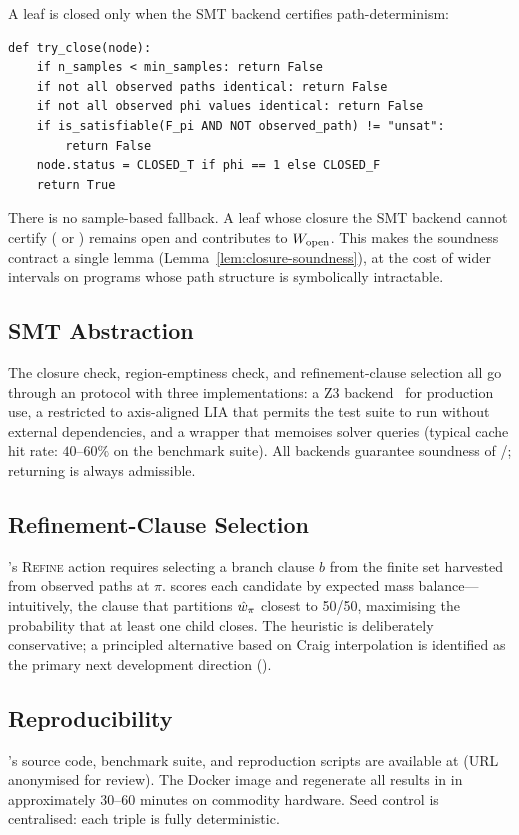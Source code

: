 A leaf is closed only when the SMT backend certifies
path-determinism:
\begin{verbatim}
def try_close(node):
    if n_samples < min_samples: return False
    if not all observed paths identical: return False
    if not all observed phi values identical: return False
    if is_satisfiable(F_pi AND NOT observed_path) != "unsat":
        return False
    node.status = CLOSED_T if phi == 1 else CLOSED_F
    return True
\end{verbatim}
There is no sample-based fallback.  A leaf whose closure the SMT
backend cannot certify (\sat{} or \unknown{}) remains open and
contributes to $W_{\mathrm{open}}$.  This makes the soundness contract a single
lemma (Lemma~\ref{lem:closure-soundness}), at the cost of wider
intervals on programs whose path structure is symbolically
intractable.

\subsection{SMT Abstraction}\label{sec:smt}

The closure check, region-emptiness check, and refinement-clause
selection all go through an  protocol with three
implementations: a Z3 backend~\cite{demoura2008z3} for production use,
a  restricted to axis-aligned LIA that permits the
test suite to run without external dependencies, and a
 wrapper that memoises solver queries (typical
cache hit rate: $40$--$60\%$ on the benchmark suite).  All backends
guarantee soundness of \sat/\unsat{}; returning \unknown{} is always
admissible.

\subsection{Refinement-Clause Selection}\label{sec:clause-selection}

\toolname{}'s \textsc{Refine} action requires selecting a branch clause
$b$ from the finite set harvested from observed paths at $\pi$.
\toolname{} scores each candidate by expected mass balance---intuitively,
the clause that partitions $\hat{w}_\pi$ closest to 50/50, maximising
the probability that at least one child closes.  The heuristic is
deliberately conservative; a principled alternative based on Craig
interpolation is identified as the primary next development direction
().

\subsection{Reproducibility}\label{sec:repro}

\toolname{}'s source code, benchmark suite, and reproduction scripts
are available at  (URL anonymised
for review).  The Docker image and 
regenerate all results in  in approximately
$30$--$60$ minutes on commodity hardware.  Seed control is
centralised: each  triple is fully
deterministic.
